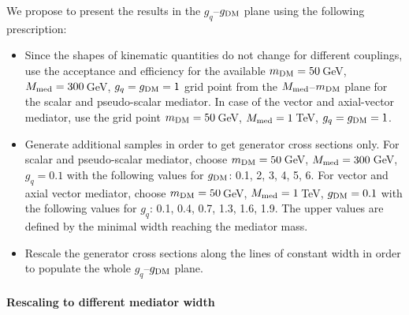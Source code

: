 We propose to present the results in the $g_q$--$g_{\rm{DM}}$ plane using the following prescription:
\begin{itemize}
\item Since the shapes of kinematic quantities do not change for different couplings, use the acceptance and efficiency for the available $m_{\rm{DM}}=50$\,GeV, $M_{\rm{med}}=300$\,GeV, $g_q=g_{\rm{DM}}=1$ grid point from the $M_{\rm{med}}$--$m_{\rm{DM}}$ plane for the scalar and pseudo-scalar mediator. In case of the vector and axial-vector mediator, use the grid point $m_{\rm{DM}}=50$\,GeV, $M_{\rm{med}}=1$\,TeV, $g_q=g_{\rm{DM}}=1$.
\item Generate additional samples in order to get generator cross sections only. For scalar and pseudo-scalar mediator, choose $m_{\rm{DM}}=50$\,GeV, $M_{\rm{med}}=300$\,GeV, $g_q=0.1$ with the following values for $g_{\rm{DM}}$: 0.1, 2, 3, 4, 5, 6. For vector and axial vector mediator, choose $m_{\rm{DM}}=50$\,GeV, $M_{\rm{med}}=1$\,TeV, $g_{\rm{DM}}=0.1$ with the following values for $g_q$: 0.1, 0.4, 0.7, 1.3, 1.6, 1.9. The upper values are defined by the minimal width reaching the mediator mass.
\item Rescale the generator cross sections along the lines of constant width in order to populate the whole $g_q$--$g_{\rm{DM}}$ plane.
\end{itemize}



\paragraph{Rescaling to different mediator width}

